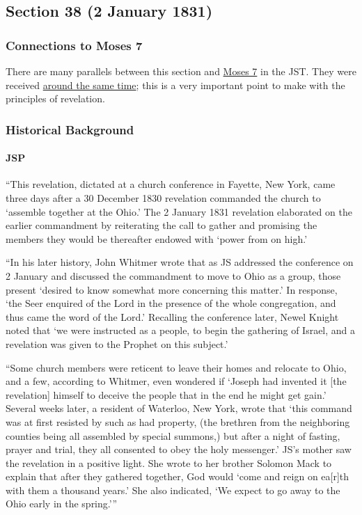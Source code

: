 \subsection{Section 38 (2 January 1831)}
	\label{DC38}
	
	\subsubsection{Connections to Moses 7}
	
		There are many parallels between this section and \hyperref[MOSES-7]{Moses 7} in the JST. They were received \hyperref[JST-TIMELINE]{around the same time}; this is a very important point to make with the principles of revelation.
	
	\subsubsection{Historical Background}
		\label{DC38-HB}
		
		\paragraph{JSP}
		
			``This revelation, dictated at a church conference in Fayette, New York, came three days after a 30 December 1830 revelation commanded the church to `assemble together at the Ohio.' The 2 January 1831 revelation elaborated on the earlier commandment by reiterating the call to gather and promising the members they would be thereafter endowed with `power from on high.'
			
			``In his later history, John Whitmer wrote that as JS addressed the conference on 2 January and discussed the commandment to move to Ohio as a group, those present `desired to know somewhat more concerning this matter.' In response, `the Seer enquired of the Lord in the presence of the whole congregation, and thus came the word of the Lord.' Recalling the conference later, Newel Knight noted that `we were instructed as a people, to begin the gathering of Israel, and a revelation was given to the Prophet on this subject.'
			
			``Some church members were reticent to leave their homes and relocate to Ohio, and a few, according to Whitmer, even wondered if `Joseph had invented it [the revelation] himself to deceive the people that in the end he might get gain.' Several weeks later, a resident of Waterloo, New York, wrote that `this command was at first resisted by such as had property, (the brethren from the neighboring counties being all assembled by special summons,) but after a night of fasting, prayer and trial, they all consented to obey the holy messenger.' JS’s mother saw the revelation in a positive light. She wrote to her brother Solomon Mack to explain that after they gathered together, God would `come and reign on ea[r]th with them a thousand years.' She also indicated, `We expect to go away to the Ohio early in the spring.'''
			

